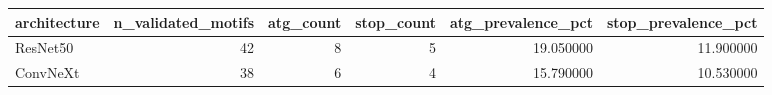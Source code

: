 \begin{tabular}{lrrrrr}
\toprule
architecture & n_validated_motifs & atg_count & stop_count & atg_prevalence_pct & stop_prevalence_pct \\
\midrule
ResNet50 & 42 & 8 & 5 & 19.050000 & 11.900000 \\
ConvNeXt & 38 & 6 & 4 & 15.790000 & 10.530000 \\
\bottomrule
\end{tabular}
